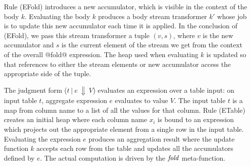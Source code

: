 Rule (EFold) introduces a new accumulator, which is visible in the context of the body $k$. Evaluating the body $k$ produces a body stream transformer $k'$ whose job is to update this new accumulator each time it is applied. In the conclusion of (EFold), we pass this stream transformer a tuple $(v, s)$, where $v$ is the new accumulator and $s$ is the current element of the stream we get from the context of the overall @fold@ expression. The heap used when evaluating $k$ is updated so that references to either the stream elements or new accumulator access the appropriate side of the tuple.

The judgment form ($t~|~e~\Downarrow~V$) evaluates an expression over a table input: on input table $t$, aggregate expression $e$ evaluates to value $V$.
The input table $t$ is a map from column name to a list of all the values for that column.
Rule (ETable) creates an initial heap where each column name $x_i$ is bound to an expression which projects out the appropriate element from a single row in the input table. Evaluating the expression $e$ produces an aggregation result where the update function $k$ accepts each row from the table and updates all the accumulators defined by $e$. The actual computation is driven by the $\mathit{fold}$ meta-function.


